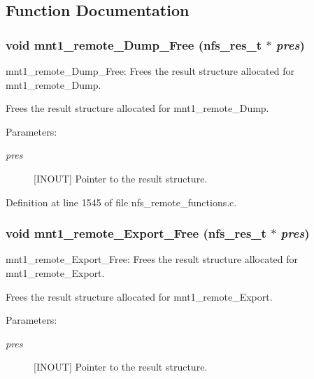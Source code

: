 \subsection{Function Documentation}
\subsubsection[{mnt1\_\-remote\_\-Dump\_\-Free}]{\setlength{\rightskip}{0pt plus 5cm}void mnt1\_\-remote\_\-Dump\_\-Free (nfs\_\-res\_\-t $\ast$ {\em pres})}\label{group__NFSprocs_gdb86516366f1b8e4c2aa0d28e62c6e31}


mnt1\_\-remote\_\-Dump\_\-Free: Frees the result structure allocated for mnt1\_\-remote\_\-Dump.

Frees the result structure allocated for mnt1\_\-remote\_\-Dump.

\begin{Desc}
\item[Parameters:]
\begin{description}
\item[{\em pres}][INOUT] Pointer to the result structure. \end{description}
\end{Desc}


Definition at line 1545 of file nfs\_\-remote\_\-functions.c.
\subsubsection[{mnt1\_\-remote\_\-Export\_\-Free}]{\setlength{\rightskip}{0pt plus 5cm}void mnt1\_\-remote\_\-Export\_\-Free (nfs\_\-res\_\-t $\ast$ {\em pres})}\label{group__NFSprocs_g3ccf08b7b908c4079abecbf91f8950cd}


mnt1\_\-remote\_\-Export\_\-Free: Frees the result structure allocated for mnt1\_\-remote\_\-Export.

Frees the result structure allocated for mnt1\_\-remote\_\-Export.

\begin{Desc}
\item[Parameters:]
\begin{description}
\item[{\em pres}][INOUT] Pointer to the result structure. \end{description}
\end{Desc}



